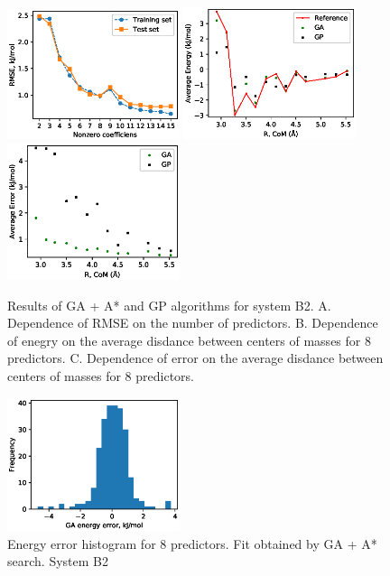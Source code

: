 \documentclass[aps,prl,reprint,amsmath,amssymb,nature]{revtex4-1}
\begin{document}
\begin{figure}
\includegraphics[width=0.45\textwidth]{media/B2_GA_PATH_RMSE.eps}
\includegraphics[width=0.45\textwidth]{media/B2_Energy_8_predictors.eps}
\includegraphics[width=0.45\textwidth]{media/B2_Error_8_predictors.eps}
\caption{Results of GA + A* and GP algorithms for system B2.  A. Dependence of RMSE on the number of predictors. B. Dependence of enegry on the average disdance between centers of masses for 8 predictors. C. Dependence of error on the average disdance between centers of masses for 8 predictors.}\label{Fig:B2}
\end{figure}

\begin{figure}
\includegraphics[width=0.45\textwidth]{media/B2_GA_energy_error_histogram_8_predictors.eps}
\caption{Energy error histogram for 8 predictors. Fit obtained by GA + A* search. System B2}\label{Fig:B2_histogram_12_predictors}
\end{figure}
\end{document}
